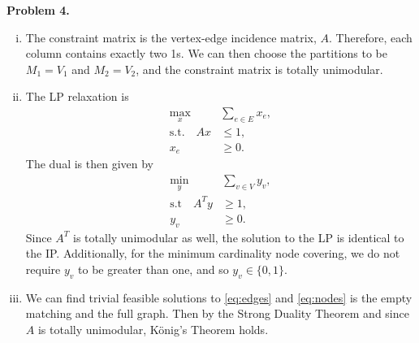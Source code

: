 \documentclass[11pt,a4paper]{article}
\begin{document}
\textbf{Problem 4.}
\begin{enumerate}[i)]
	\item The constraint matrix is the vertex-edge incidence matrix, $A$. Therefore, each column contains exactly two 1s. We can then choose the partitions to be $M_1 = V_1$ and $M_2 = V_2$, and the constraint matrix is totally unimodular.
	\item The LP relaxation is
	\begin{align}
		\nonumber \max_x & \sum_{e \in E} x_e, \\
		\text{s.t.} \quad A x &\leq 1, \label{eq:edges} \\
		\nonumber x_e &\geq 0.
	\end{align}
	The dual is then given by
	\begin{align}
		\nonumber \min_y & \sum_{v \in V} y_v, \\
		\text{s.t} \quad A^T y &\geq 1, \label{eq:nodes} \\
		\nonumber y_v &\geq 0.
	\end{align}
	Since $A^T$ is totally unimodular as well, the solution to the LP is identical to the IP. Additionally, for the minimum cardinality node covering, we do not require $y_v$ to be greater than one, and so $y_v \in \{ 0, 1 \}$.
	\item We can find trivial feasible solutions to \eqref{eq:edges} and \eqref{eq:nodes} is the empty matching and the full graph. Then by the Strong Duality Theorem and since $A$ is totally unimodular, K\"{o}nig's Theorem holds.
\end{enumerate}
\end{document}
